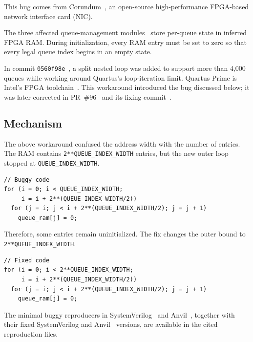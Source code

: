 \documentclass[conference]{IEEEtran}
\begin{document}
This bug comes from Corundum~\cite{corundum}, an open-source
high-performance FPGA-based network interface card (NIC).

The three affected queue-management modules~\cite{queue-manager-src,
cpl-queue-manager-src,tx-scheduler-src} store per-queue state in inferred
FPGA RAM. During initialization, every RAM entry must be set to zero so that
every legal queue index begins in an empty state.

In commit \texttt{0560f98e}~\cite{corundum-intro}, a split nested loop was added
to support more than 4,000 queues while working around Quartus's loop-iteration
limit. Quartus Prime is Intel's FPGA toolchain~\cite{quartus}. This workaround
introduced the bug discussed below;
it was later corrected in PR~\#96~\cite{corundum-fix} and its fixing
commit~\cite{corundum-fix-commit}.



\subsection{Mechanism}

The above workaround confused the address width with the number of entries. The RAM
contains \texttt{2**QUEUE\_INDEX\_WIDTH} entries, but the new outer loop
stopped at \texttt{QUEUE\_INDEX\_WIDTH}.

\begin{lstlisting}
// Buggy code
for (i = 0; i < QUEUE_INDEX_WIDTH;
     i = i + 2**(QUEUE_INDEX_WIDTH/2))
  for (j = i; j < i + 2**(QUEUE_INDEX_WIDTH/2); j = j + 1)
    queue_ram[j] = 0;
\end{lstlisting}

Therefore, some entries remain uninitialized. The fix changes the outer bound
to \texttt{2**QUEUE\_INDEX\_WIDTH}.

\begin{lstlisting}
// Fixed code
for (i = 0; i < 2**QUEUE_INDEX_WIDTH;
     i = i + 2**(QUEUE_INDEX_WIDTH/2))
  for (j = i; j < i + 2**(QUEUE_INDEX_WIDTH/2); j = j + 1)
    queue_ram[j] = 0;
\end{lstlisting}

The minimal buggy reproducers in SystemVerilog~\cite{bug1-sv-buggy} and
Anvil~\cite{bug1-anvil-buggy}, together with their fixed SystemVerilog
\cite{bug1-sv-fixed} and Anvil~\cite{bug1-anvil-fixed} versions, are available
in the cited reproduction files.
\end{document}
